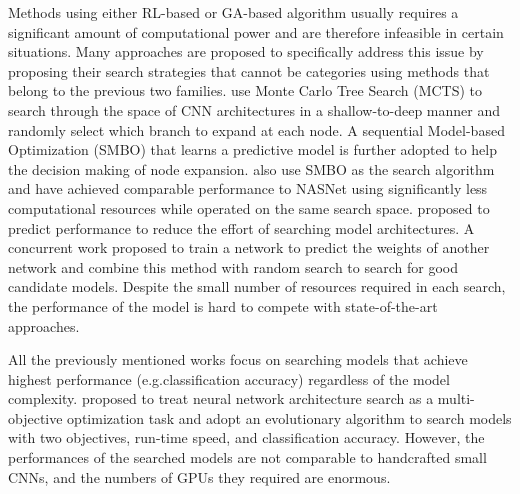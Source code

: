 \documentclass[runningheads]{llncs}
\def\eg{e.g.}
\begin{document}
Methods using either RL-based or GA-based algorithm usually requires a significant amount of computational power and are therefore infeasible in certain situations. Many approaches are proposed to specifically address this issue by proposing their search strategies that cannot be categories using methods that belong to the previous two families. \cite{negrinho2017deeparchitect} use Monte Carlo Tree Search (MCTS) to search through the space of CNN architectures in a shallow-to-deep manner and randomly select which branch to expand at each node. A sequential Model-based Optimization (SMBO) \cite{hutter2011sequential} that learns a predictive model is further adopted to help the decision making of node expansion. \cite{liu2017progressive} also use SMBO as the search algorithm and have achieved comparable performance to NASNet using significantly less computational resources while operated on the same search space. \cite{baker2018accelerating} proposed to predict performance to reduce the effort of searching model architectures. A concurrent work \cite{brock2017smash} proposed to train a network to predict the weights of another network and combine this method with random search to search for good candidate models. Despite the small number of resources required in each search, the performance of the model is hard to compete with state-of-the-art approaches.

All the previously mentioned works focus on searching models that achieve highest performance (\eg classification accuracy) regardless of the model complexity. \cite{kimnemo} proposed to treat neural network architecture search as a multi-objective optimization task and adopt an evolutionary algorithm to search models with two objectives, run-time speed, and classification accuracy. However, the performances of the searched models are not comparable to handcrafted small CNNs, and the numbers of GPUs they required are enormous.
\end{document}
